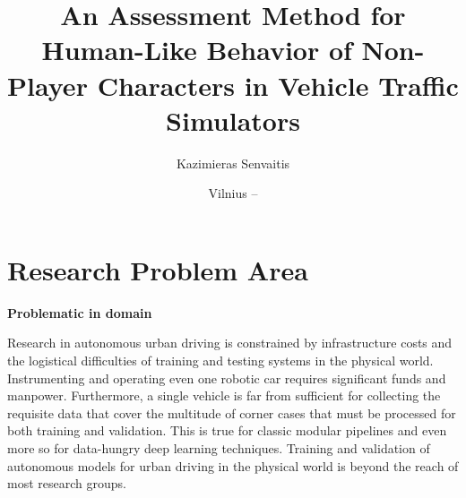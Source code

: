 \documentclass{VUMIFPS-master-intro}
\title{An Assessment Method for Human-Like Behavior of Non-Player Characters in Vehicle Traffic Simulators}
\author{Kazimieras Senvaitis}
\date{Vilnius – \the\year}
\begin{document}
\maketitle



\tableofcontents

\section{Research Problem Area}

\textbf{Problematic in domain}

Research in autonomous urban driving is constrained by infrastructure costs and the logistical difficulties of training and testing systems in the physical world. Instrumenting and operating even one robotic car requires significant funds and manpower. Furthermore, a single vehicle is far from sufficient for collecting the requisite data that cover the multitude of corner cases that must be processed for both training and validation. This is true for classic modular pipelines and even more so for data-hungry deep learning techniques. Training and validation of autonomous models for urban driving in the physical world is beyond the reach of most research groups. \cite{Dosovitskiy2017}


\end{document}

